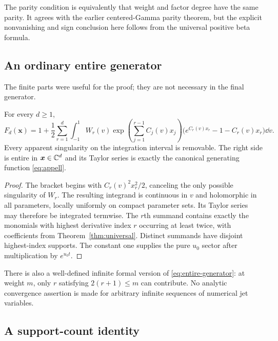 The parity condition is equivalently that weight and factor degree have the same parity. It agrees with the earlier centered-Gamma parity theorem, but the explicit nonvanishing and sign conclusion here follows from the universal positive beta formula.

\subsection{An ordinary entire generator}

The finite parts were useful for the proof; they are not necessary in the final generator.

\begin{theorem}\label{thm:entire}
For every $d\ge1$,
\begin{equation}\label{eq:entire-generator}
 \boxed{\displaystyle
 F_d(\boldsymbol x)=1+\frac12\sum_{r=1}^d\int_{-1}^1
 W_r(v)\exp\left(\sum_{j=1}^{r-1}C_j(v)x_j\right)
 \bigl(e^{C_r(v)x_r}-1-C_r(v)x_r\bigr)\dd v.}
\end{equation}
Every apparent singularity on the integration interval is removable. The right side is entire in $\boldsymbol x\in\mathbb C^d$ and its Taylor series is exactly the canonical generating function \eqref{eq:appell}.
\end{theorem}
\begin{proof}
The bracket begins with $C_r(v)^2x_r^2/2$, canceling the only possible singularity of $W_r$. The resulting integrand is continuous in $v$ and holomorphic in all parameters, locally uniformly on compact parameter sets. Its Taylor series may therefore be integrated termwise. The $r$th summand contains exactly the monomials with highest derivative index $r$ occurring at least twice, with coefficients from Theorem~\ref{thm:universal}. Distinct summands have disjoint highest-index supports. The constant one supplies the pure $u_0$ sector after multiplication by $e^{u_0t}$.
\end{proof}

There is also a well-defined infinite formal version of \eqref{eq:entire-generator}: at weight $m$, only $r$ satisfying $2(r+1)\le m$ can contribute. No analytic convergence assertion is made for arbitrary infinite sequences of numerical jet variables.

\subsection{A support-count identity}

